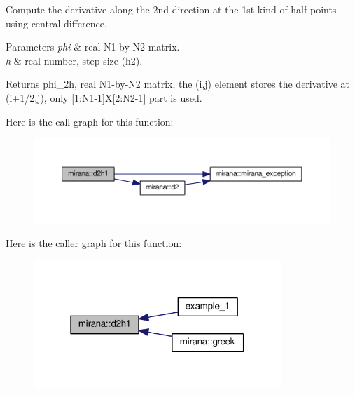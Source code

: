 Compute the derivative along the 2nd direction at the 1st kind of half points using central difference. 


\begin{DoxyParams}{Parameters}
{\em phi} & real N1-\/by-\/\+N2 matrix. \\
\hline
{\em h} & real number, step size (h2). \\
\hline
\end{DoxyParams}
\begin{DoxyReturn}{Returns}
phi\+\_\+2h, real N1-\/by-\/\+N2 matrix, the (i,j) element stores the derivative at (i+1/2,j), only \mbox{[}1\+:N1-\/1\mbox{]}X\mbox{[}2\+:N2-\/1\mbox{]} part is used. 
\end{DoxyReturn}


Here is the call graph for this function\+:\nopagebreak
\begin{figure}[H]
\begin{center}
\leavevmode
\includegraphics[width=350pt]{namespacemirana_a9341f957abd27c5132c557ae873055bd_cgraph}
\end{center}
\end{figure}




Here is the caller graph for this function\+:\nopagebreak
\begin{figure}[H]
\begin{center}
\leavevmode
\includegraphics[width=265pt]{namespacemirana_a9341f957abd27c5132c557ae873055bd_icgraph}
\end{center}
\end{figure}


\hypertarget{namespacemirana_a4f47c93df57dd51d1414b2514fd1b339}{}
